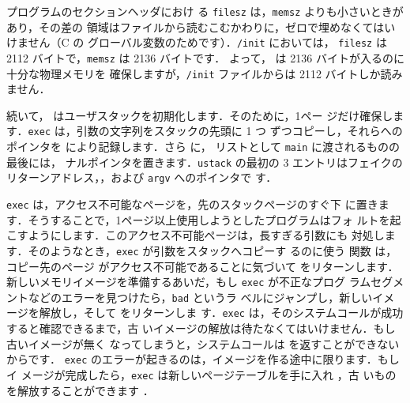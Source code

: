 プログラムのセクションヘッダにおけ
る \lstinline{filesz} は，\lstinline{memsz} よりも小さいときがあり，その差の
領域はファイルから読むこむかわりに，ゼロで埋めなくてはいけません（C の
グローバル変数のためです）．\lstinline{/init} においては，
\lstinline{filesz} は 2112 バイトで，\lstinline{memsz} は 2136 バイトです．
よって， は 2136 バイトが入るのに十分な物理メモリを
確保しますが，\lstinline{/init} ファイルからは 2112 バイトしか読みません．

続いて， はユーザスタックを初期化します．そのために，1ペー
ジだけ確保します．\lstinline{exec} は，引数の文字列をスタックの先頭に 1 つ
ずつコピーし，それらへのポインタを  により記録します．さら
に， リストとして \lstinline{main} に渡されるものの最後には，
ナルポインタを置きます．\lstinline{ustack} の最初の 3 エントリはフェイクの
リターンアドレス，，および \lstinline{argv} へのポインタで
す．

\lstinline{exec} は，アクセス不可能なページを，先のスタックページのすぐ下
に置きます．そうすることで，1ページ以上使用しようとしたプログラムはフォ
ルトを起こすようにします．このアクセス不可能ページは，長すぎる引数にも
対処します．そのようなとき，\lstinline{exec} が引数をスタックへコピーす
るのに使う  関数  は，コピー先のページ
がアクセス不可能であることに気づいて  をリターンします．
新しいメモリイメージを準備するあいだ，もし \lstinline{exec} が不正なプログ
ラムセグメントなどのエラーを見つけたら，\lstinline{bad} というラ
ベルにジャンプし，新しいイメージを解放し，そして  をリターンしま
す．\lstinline{exec} は，そのシステムコールが成功すると確認できるまで，古
いイメージの解放は待たなくてはいけません．もし古いイメージが無く
なってしまうと，システムコールは  を返すことができないからです．
\lstinline{exec} のエラーが起きるのは，イメージを作る途中に限ります．もしイ
メージが完成したら，\lstinline{exec} は新しいページテーブルを手に入れ ，古
いものを解放することができます ．

